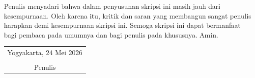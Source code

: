 Penulis menyadari bahwa dalam penyusunan skripsi ini masih jauh dari kesempurnaan. Oleh karena itu, kritik dan saran yang membangun sangat penulis harapkan demi kesempurnaan skripsi ini. Semoga skripsi ini dapat bermanfaat bagi pembaca pada umumnya dan bagi penulis pada khususnya. Amin.

\begin{flushright}
	\begin{tabular}{c}
		Yogyakarta, 24 Mei 2026 \\
		\vspace{1cm} \\
		Penulis \\
	\end{tabular}
\end{flushright}